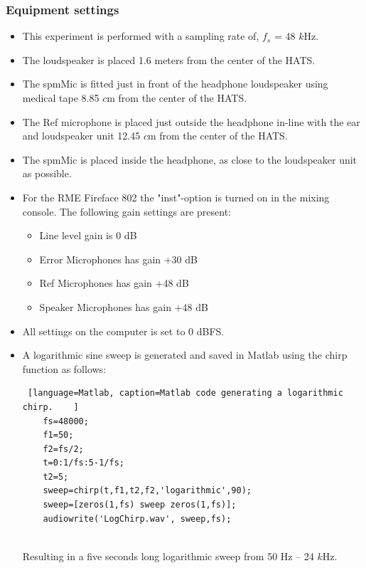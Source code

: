 \subsubsection{Equipment settings}\label{sec:SettingsAngInc}
\begin{itemize}
	\item This experiment is performed with a sampling rate of, $f_{s}$ = 48 $k$Hz.
	\item The loudspeaker is placed 1.6 meters from the center of the HATS.
	\item The spmMic is fitted just in front of the headphone loudspeaker using medical tape 8.85 $c$m from the center of the HATS.
	\item The Ref microphone is placed just outside the headphone in-line with the ear and loudspeaker unit 12.45 $c$m from the center of the HATS. 
	\item The spmMic is placed inside the headphone, as close to the loudspeaker unit as possible. 
	\item For the RME Fireface 802 the "inst"-option is turned on in the mixing console. The following gain settings are present: 		
	\begin{itemize}
		\item Line level gain is 0 dB
		\item Error Microphones has gain +30 dB
		\item Ref Microphones has gain +48 dB
		\item Speaker Microphones has gain +48 dB
	\end{itemize}
	\item All settings on the computer is set to 0 dBFS.
	\item A logarithmic sine sweep is generated and saved in Matlab using the chirp function as follows:
	\begin{lstlisting} [language=Matlab, caption=Matlab code generating a logarithmic chirp.	]
	fs=48000;
	f1=50;
	f2=fs/2;
	t=0:1/fs:5-1/fs;
	t2=5;
	sweep=chirp(t,f1,t2,f2,'logarithmic',90);
	sweep=[zeros(1,fs) sweep zeros(1,fs)];
	audiowrite('LogChirp.wav', sweep,fs);
	
	\end{lstlisting}
	Resulting in a five seconds long logarithmic sweep from 50 Hz -- 24 $k$Hz.
\end{itemize} 
 
